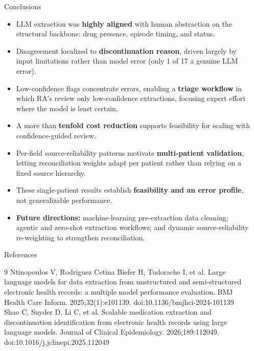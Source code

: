\documentclass[final]{beamer}
\newlength{\sepwidth}
\newlength{\colnarrow}  %
\newcommand{\separatorcolumn}{\begin{column}{\sepwidth}\end{column}}
\begin{document}
\begin{frame}[t]
\begin{columns}[t]
\begin{column}{\colnarrow}
 \begin{block}{Conclusions}
  \begin{itemize}
    \item LLM extraction was \textbf{highly aligned} with human abstraction on the
      structural backbone: drug presence, episode timing, and status.
\item Disagreement localized to \textbf{discontinuation reason}, driven largely
      by input limitations rather than model error (only 1 of 17 a genuine LLM
      error).
\item Low-confidence flags concentrate errors, enabling a \textbf{triage
      workflow} in which RA's review only low-confidence extractions,
      focusing expert effort where the model is least certain.
\item A more than \textbf{tenfold cost reduction} supports feasibility for
      scaling with confidence-guided review.
\item Per-field source-reliability patterns motivate \textbf{multi-patient
      validation}, letting reconciliation weights adapt per patient rather than
      relying on a fixed source hierarchy.
\item These single-patient results establish \textbf{feasibility and an error
      profile}, not generalizable performance.
\item \textbf{Future directions:} machine-learning pre-extraction data
      cleaning; agentic and zero-shot extraction workflows; and dynamic
      source-reliability re-weighting to strengthen reconciliation.
  \end{itemize}
  \vspace{-0.6em}
\end{block}

\begin{block}{References}
  \footnotesize
\vspace{-0.6em}

  \begin{thebibliography}{9}
     Ntinopoulos V, Rodriguez Cetina Biefer H, Tudorache I, et al. Large language models for data extraction from unstructured and semi-structured electronic health records: a multiple model performance evaluation. BMJ Health Care Inform. 2025;32(1):e101139. doi:10.1136/bmjhci-2024-101139
      Shao C, Snyder D, Li C, et al. Scalable medication extraction and discontinuation identification from electronic health records using large language models. Journal of Clinical Epidemiology. 2026;189:112049. doi:10.1016/j.jclinepi.2025.112049
  \end{thebibliography}
\end{block}

\end{column}

\separatorcolumn
\end{columns}
\end{frame}
\end{document}
